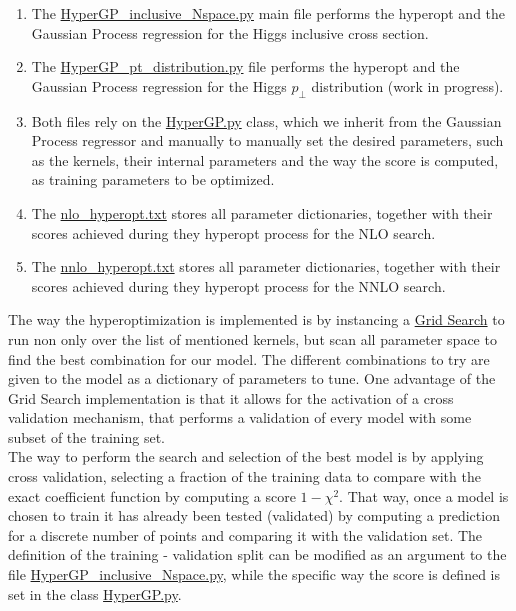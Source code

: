 \documentclass[12pt]{article}
\begin{document}
\begin{enumerate}
	\item The \href{https://github.com/N3PDF/crystalball/blob/jesus_gp/HyperGP_inclusive_Nspace.py}{{\color{blue}HyperGP\_inclusive\_Nspace.py}} main file performs the hyperopt and the Gaussian Process regression for the Higgs inclusive cross section.
	\item The
	\href{https://github.com/N3PDF/crystalball/blob/jesus_gp/HyperGP_pt_distribution.py}{{\color{blue}HyperGP\_pt\_distribution.py}} file performs the hyperopt and the Gaussian Process regression for the Higgs $p_{\perp}$ distribution (work in progress).
	\item Both files rely on the \href{https://github.com/N3PDF/crystalball/blob/jesus_gp/HyperGP.py}{{\color{blue}HyperGP.py}} class, which we inherit from the Gaussian Process regressor and manually to manually set the desired parameters, such as the kernels, their internal parameters and the way the score is computed, as training parameters to be optimized.
	\item The \href{https://github.com/N3PDF/crystalball/blob/jesus_gp/summary/nlo_hyperopt.txt}{{\color{blue}nlo\_hyperopt.txt}} stores all parameter dictionaries, together with their scores achieved during they hyperopt process for the NLO search.
	\item The \href{https://github.com/N3PDF/crystalball/blob/jesus_gp/summary/nnlo_hyperopt.txt}{{\color{blue}nnlo\_hyperopt.txt}} stores all parameter dictionaries, together with their scores achieved during they hyperopt process for the NNLO search.
\end{enumerate}

The way the hyperoptimization is implemented is by instancing a  \href{https://scikit-learn.org/stable/modules/generated/sklearn.model_selection.GridSearchCV.html}{Grid Search} to run non only over the list of mentioned kernels, but scan all parameter space to find the best combination for our model. The different combinations to try are given to the model as a dictionary of parameters to tune. One advantage of the Grid Search implementation is that it allows for the activation of a cross validation mechanism, that performs a validation of every model with some subset of the training set. \\

The way to perform the search and selection of the best model is by applying cross validation, selecting a fraction of the training data to compare with the exact coefficient function by computing a score $1 - \chi^{2}$. That way, once a model is chosen to train it has already been tested (validated) by computing a prediction for a discrete number of points and comparing it with the validation set. The definition of the training - validation split can be modified as an argument to the file \href{https://github.com/N3PDF/crystalball/blob/jesus_gp/HyperGP_inclusive_Nspace.py}{{\color{blue}HyperGP\_inclusive\_Nspace.py}}, while the specific way the score is defined is set in the class \href{https://github.com/N3PDF/crystalball/blob/jesus_gp/HyperGP.py}{{\color{blue}HyperGP.py}}. \\
\end{document}
